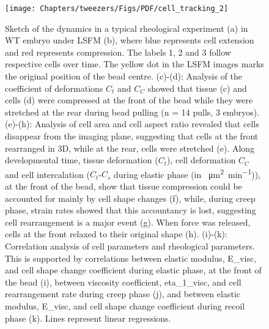  \begin{figure}
 \centering
  \texttt{[image: Chapters/tweezers/Figs/PDF/cell\_tracking\_2]} %
 \caption[Sketch of the dynamics in a typical rheological experiment]{\footnotemark
 Sketch of the dynamics in a typical rheological experiment (a) in \gls{WT} embryo under \gls{LSFM} (b), where blue represents cell extension and red represents compression.
 The labels 1, 2 and 3 follow respective cells over time.
 The yellow dot in the \gls{LSFM} images marks the original position  of the bead centre.
 (c)-(d): Analysis of the coefficient of deformations \(C_t\) and \(C_C\) showed that tissue (c) and cells (d) were compressed at the front  of the bead while they were stretched at the rear during bead  pulling (n = 14 pulls, 3 embryos).
 (e)-(h): Analysis of cell area  and cell aspect ratio revealed that cells disappear from the imaging plane, suggesting that cells at the front rearranged in 3D, while at the rear, cells were stretched (e).
 Along developmental time, tissue deformation (\(C_t\)), cell deformation \(C_C\) and cell intercalation (\(C_t\)-\(C_s\) during elastic phase (in \SI{}{\micro\metre\squared\per\minute})), at the front of the bead, show that tissue compression could be accounted for mainly by cell shape changes (f), while, during creep phase, strain rates showed that this accountancy is lost, suggesting cell rearrangement is a major event (g).
 When force was released, cells at the front relaxed to their original shape (h).
 (i)-(k): Correlation analysis of cell parameters and rheological parameters.
 This is supported by correlations between elastic modulus, \gls{E_visc}, and cell shape change coefficient during elastic phase, at the front of the bead (i), between viscosity coefficient, \gls{eta_1_visc}, and cell rearrangement rate during creep phase (j), and between elastic modulus,  \gls{E_visc}, and cell shape change  coefficient during recoil phase (k).
 Lines represent linear regressions.
}
\end{figure}
